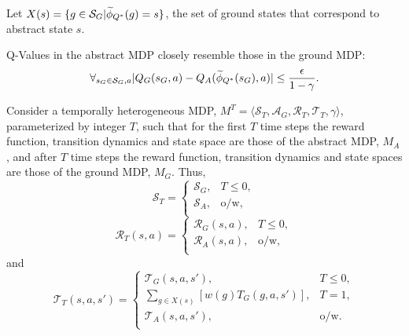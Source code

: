 
Let $X(s) = \{g \in \mathcal{S}_G | \widetilde \phi_{Q^*}(g) = s\}$, the set of ground states that correspond to abstract state $s$.

\begin{clm}
Q-Values in the abstract \ac{MDP} closely resemble those in the ground \ac{MDP}:
\begin{equation}
\label{eq:Q*Claim1}
\forall_{s_G \in \mathcal{S}_G, a} |Q_G(s_G, a) - Q_A(\widetilde \phi_{Q^*}(s_G), a)| \leq \frac{\epsilon}{1-\gamma}.
\end{equation}
\end{clm}

Consider a temporally heterogeneous \ac{MDP}, $M^T = \langle \mathcal{S}_T, \mathcal{A}_G, \mathcal{R}_T, \mathcal{T}_T, \gamma \rangle$, parameterized by integer $T$, such that for the first $T$ time steps the reward function, transition dynamics and state space are those of the abstract MDP, $M_A$, and after $T$ time steps the reward function, transition dynamics and state spaces are those of the ground MDP, $M_G$. Thus,
\begin{equation}
\mathcal{S}_T = \begin{cases}
\mathcal{S}_G,& T \leq 0, \\
\mathcal{S}_A,& \text{o/w}, \\
\end{cases}
\end{equation}
\begin{equation}
\mathcal{R}_T(s,a) = \begin{cases}
\mathcal{R}_G(s,a),& T \leq 0, \\
\mathcal{R}_A(s, a),& \text{o/w}, \\
\end{cases}
\end{equation}
and
\begin{equation}
\mathcal{T}_T(s,a,s') = \begin{cases}
\mathcal{T}_G(s,a,s'),& T \leq 0, \\
\underset{{g \in X(s)}}{\sum}\left[w(g)T_G(g, a, s')\right],& T = 1, \\
\mathcal{T}_A(s,a,s'),& \text{o/w}. \\
\end{cases}
\end{equation}

